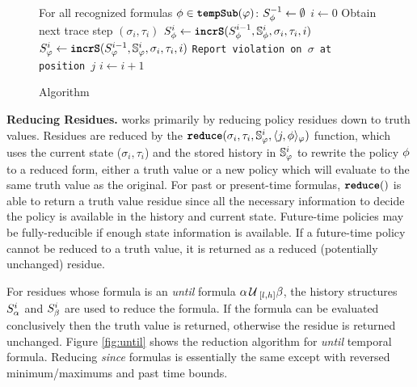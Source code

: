 \begin{figure}[t]
\begin{algorithmic}[1]
\STATE For all recognized formulas $\policyv \in \tempSub(\policy)$: $\histst[\policyv]{-1} \leftarrow \emptyset$
\STATE $i \leftarrow 0$
\LOOP
\STATE Obtain next trace step $(\sigma_i, \tau_i)$ 
	\STATE $\histst[\policyv]{i} \leftarrow \incrS(\histst[\policyv]{i-1}, \histSt[\policyv]{i}, \sigma_i, \tau_i, i)$
\ENDFOR
\STATE $\histst{i} \leftarrow \incrS(\histst{i-1}, \histSt{i}, \sigma_i, \tau_i, i)$
\STATE \texttt{Report violation on $\sigma$ at position $j$}
\ENDFOR
\STATE $i \leftarrow i + 1$
\ENDLOOP
\end{algorithmic}
\caption{\monitor Algorithm}\label{fig:algorithm}
\end{figure}

\textbf{Reducing Residues.}
\monitor works primarily by reducing policy residues down to truth values. Residues are reduced by the $\reduce(\sigma_i, \tau_i, \histSt{i}, \rpt{j}{\policyv}{\policy})$ function, which uses the current state ($\sigma_i,\tau_i$) and the stored history in $\histSt{i}$ to rewrite the policy $\policyv$ to a reduced form, either a truth value or a new policy which will evaluate to the same truth value as the original. For past or present-time formulas, $\reduce()$ is able to return a truth value residue since all the necessary information to decide the policy is available in the history and current state. Future-time policies may be fully-reducible if enough state information is available. If a future-time policy cannot be reduced to a truth value, it is returned as a reduced (potentially unchanged) residue.

For residues whose formula is an \emph{until} formula $\alpha \until_{[l,h]} \beta$, the history structures $\histst[\alpha]{i}$ and $\histst[\beta]{i}$ are used to reduce the formula. 
If the formula can be evaluated conclusively then the truth value is returned, otherwise the residue is returned unchanged. 
Figure \ref{fig:until} shows the reduction algorithm for \emph{until} temporal formula. Reducing \emph{since} formulas is essentially the same except with reversed minimum/maximums and past time bounds.

